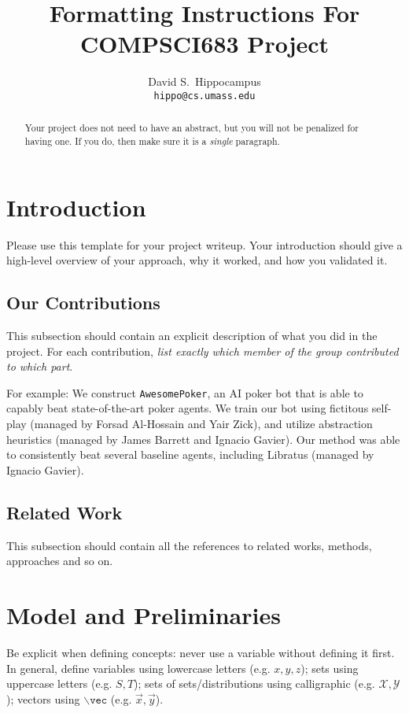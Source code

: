 \documentclass{article}
\title{Formatting Instructions For COMPSCI683 Project}
\author{%
  David S.~Hippocampus\\
  \texttt{hippo@cs.umass.edu} \\
}
\theoremstyle{definition}
\begin{document}
\maketitle


\begin{abstract}
Your project does not need to have an abstract, but you will not be penalized for having one. If you do, then make sure it is a \emph{single} paragraph.
\end{abstract}

\section{Introduction}\label{sec:intro}
Please use this template for your project writeup. 
Your introduction should give a high-level overview of your approach, why it worked, and how you validated it.  
\subsection{Our Contributions}\label{sec:contrib}
This subsection should contain an explicit description of what you did in the project. For each contribution, \emph{list exactly which member of the group contributed to which part}.

For example:
We construct \texttt{AwesomePoker}, an AI poker bot that is able to capably beat state-of-the-art poker agents. 
We train our bot using fictitous self-play (managed by Forsad Al-Hossain and Yair Zick), and utilize abstraction heuristics (managed by James Barrett and Ignacio Gavier). Our method was able to consistently beat several baseline agents, including Libratus \cite{brown2019poker} (managed by Ignacio Gavier).
\subsection{Related Work}\label{sec:related}
This subsection should contain all the references to related works, methods, approaches and so on. 
\section{Model and Preliminaries}
Be explicit when defining concepts: never use a variable without defining it first. 
In general, define variables using lowercase letters (e.g. $x,y,z$); sets using uppercase letters (e.g. $S,T$); sets of sets/distributions using calligraphic (e.g. $\mathcal X,\mathcal Y$); vectors using $\backslash\texttt{vec}$ (e.g. $\vec x,\vec y$). 
\end{document}
